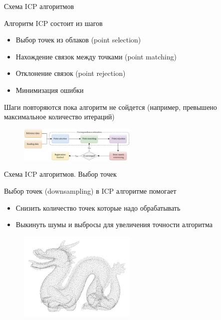 \documentclass[6pt,pdf,utf8,russian]{beamer}
\begin{document}
\begin{frame}[fragile]{Схема ICP алгоритмов}
    \begin{block}{}
        Алгоритм ICP состоит из шагов
        \begin{itemize}
            \item Выбор точек из облаков (point selection)
            \item Нахождение связок между точками (point matching)
            \item Отклонение связок (point rejection)
            \item Минимизация ошибки
        \end{itemize}
        Шаги повторяются пока алгоритм не сойдется (например, превышено максимальное количество итераций)
    \end{block}

    \begin{figure}
        \includegraphics[width=0.5\textwidth]{images/icp_scheme.png}
    \end{figure}

\end{frame}

\begin{frame}[fragile]{Схема ICP алгоритмов. Выбор точек}
    \begin{block}{}
        Выбор точек (downsampling) в ICP алгоритме помогает
        \begin{itemize}
            \item Снизить количество точек которые надо обрабатывать
            \item Выкинуть шумы и выбросы для увеличения точности алгоритма
        \end{itemize}
    \end{block}

    \pause

    \begin{figure}
        \includegraphics[width=0.5\textwidth]{images/icp_downsampling.jpg}
    \end{figure}

\end{frame}
\end{document}
